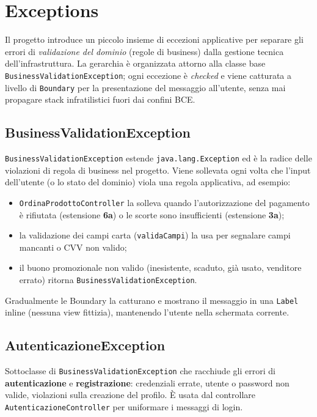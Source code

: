 \chapter{Exceptions}
\label{cap:exceptions}

Il progetto introduce un piccolo insieme di eccezioni applicative per separare
gli errori di \emph{validazione del dominio} (regole di business) dalla
gestione tecnica dell'infrastruttura. La gerarchia è organizzata attorno alla
classe base \texttt{BusinessValidationException}; ogni eccezione è \emph{checked}
e viene catturata a livello di \texttt{Boundary} per la presentazione del
messaggio all'utente, senza mai propagare stack infratilistici fuori dai
confini BCE.

\section{BusinessValidationException}
\texttt{BusinessValidationException} estende \texttt{java.lang.Exception}
ed è la radice delle violazioni di regola di business nel progetto. Viene
sollevata ogni volta che l'input dell'utente (o lo stato del dominio) viola
una regola applicativa, ad esempio:
\begin{itemize}
    \item \texttt{OrdinaProdottoController} la solleva quando l'autorizzazione
    del pagamento è rifiutata (estensione \textbf{6a}) o le scorte sono
    insufficienti (estensione \textbf{3a});
    \item la validazione dei campi carta (\texttt{validaCampi}) la usa per
    segnalare campi mancanti o CVV non valido;
    \item il buono promozionale non valido (inesistente, scaduto, già usato,
    venditore errato) ritorna \texttt{BusinessValidationException}.
\end{itemize}
Gradualmente le Boundary la catturano e mostrano il messaggio in una
\texttt{Label} inline (nessuna view fittizia), mantenendo l'utente nella
schermata corrente.

\section{AutenticazioneException}
Sottoclasse di \texttt{BusinessValidationException} che racchiude gli errori
di \textbf{autenticazione} e \textbf{registrazione}: credenziali errate,
utente o password non valide, violazioni sulla creazione del profilo. È
usata dal controllare \texttt{AutenticazioneController} per uniformare i
messaggi di login.

